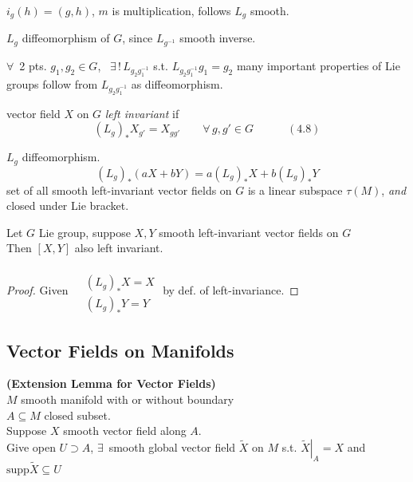 $i_g(h) = (g,h)$, $m$ is multiplication, follows $L_g$ smooth.  

$L_g$ diffeomorphism of $G$, since $L_{g^{-1}}$ smooth inverse. 

$\forall \, $ 2 pts. $g_1, g_2 \in G$, \, $\exists \, ! \, L_{g_2 g_1^{-1}}$ s.t. $L_{g_2 g_1^{-1}} g_1 = g_2$  many important properties of Lie groups follow from $L_{g_2 g_1^{-1}}$ as diffeomorphism.  

vector field $X$ on $G$ \emph{left invariant} if 
\begin{equation}
  (L_g)_* X_{g'} = X_{gg'} \quad \quad \forall \, g, g' \in G \quad \quad \quad (4.8)
\end{equation}

$L_g$ diffeomorphism.  
\[
(L_g)_*(aX+ bY) = a(L_g)_*X + b(L_g)_* Y
\]
set of all smooth left-invariant vector fields on $G$ is a linear subspace $\tau(M)$, \emph{ and } closed under Lie bracket.  

\begin{lemma}[4.18] 
Let $G$ Lie group, suppose $X,Y$ smooth left-invariant vector fields on $G$ \\
Then $[X,Y]$ also left invariant.  
\end{lemma}

\begin{proof}
  Given $\begin{aligned} & \quad \\ & (L_g)_*X = X \\ & (L_g)_* Y = Y \end{aligned}$ by def. of left-invariance.  
\end{proof}









\subsection*{Vector Fields on Manifolds}

\begin{lemma}[8.6] \textbf{(Extension Lemma for Vector Fields)} \\
  $M$ smooth manifold with or without boundary \\
$A \subseteq M$ closed subset. \\
Suppose $X$ smooth vector field along $A$.  \\
Give open $U \supset A$, $\exists \, $ smooth global vector field $\widetilde{X}$ on $M$ s.t. $\left. \widetilde{X} \right|_A = X$ and $\text{supp}{\widetilde{X}} \subseteq U$
\end{lemma}

